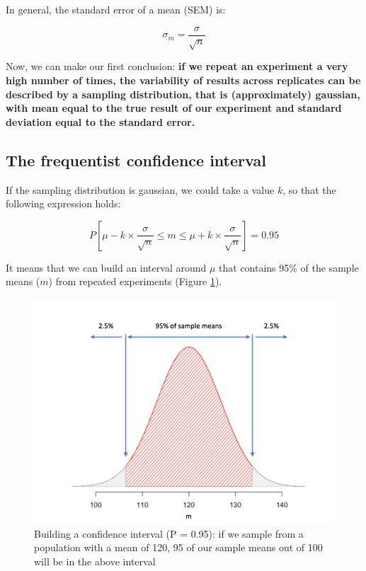 \documentclass[a4paper,12pt,oneside]{book}
\begin{document}
In general, the standard error of a mean (SEM) is:

\[\sigma_m  = \frac{\sigma}{\sqrt n}\]

Now, we can make our first conclusion: \textbf{if we repeat an experiment a very high number of times, the variability of results across replicates can be described by a sampling distribution, that is (approximately) gaussian, with mean equal to the true result of our experiment and standard deviation equal to the standard error.}

\hypertarget{the-frequentist-confidence-interval}{%
\subsection{The frequentist confidence interval}\label{the-frequentist-confidence-interval}}

If the sampling distribution is gaussian, we could take a value \(k\), so that the following expression holds:

\[P \left[ \mu - k \times \frac{\sigma}{\sqrt{n} } \leq m \leq \mu + k \times \frac{\sigma}{\sqrt{n} } \right] = 0.95\]

It means that we can build an interval around \(\mu\) that contains 95\% of the sample means (\(m\)) from repeated experiments (Figure \ref{fig:figName62b}).

\begin{figure}

{\centering \includegraphics[width=0.9\linewidth]{_images/ConfidenceInterval} 

}

\caption{Building a confidence interval (P = 0.95): if we sample from a population with a mean of 120, 95 of our sample means out of 100 will be in the above interval}\label{fig:figName62b}
\end{figure}
\end{document}
